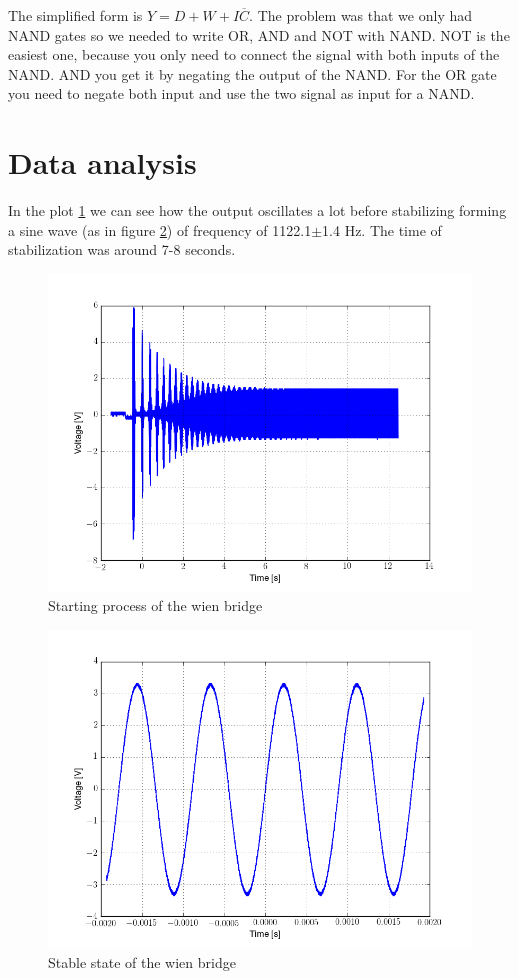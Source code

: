 The simplified form is $Y = D + W + I\overline{C}$. The problem was that we only had NAND gates so we needed to write OR, AND and NOT with NAND. NOT is the easiest one, because you only need to connect the signal with both inputs of the NAND. AND you get it by negating the output of the NAND. For the OR gate you need to negate both input and use the two signal as input  for a NAND.


\section{Data analysis}
In the plot \ref{starting} we can see how the output oscillates a lot before stabilizing forming a sine wave (as in figure \ref{stable}) of frequency of 1122.1$\pm$1.4 Hz. The time of stabilization was around 7-8 seconds.


\begin{figure}[H]
\centering
\includegraphics[width=.7\textwidth]{9/starting.png}
\caption{Starting process of the wien bridge}\label{starting}
\end{figure}

\begin{figure}[H]
\centering
\includegraphics[width=.7\textwidth]{9/stable.png}
\caption{Stable state of the wien bridge}\label{stable}
\end{figure}

